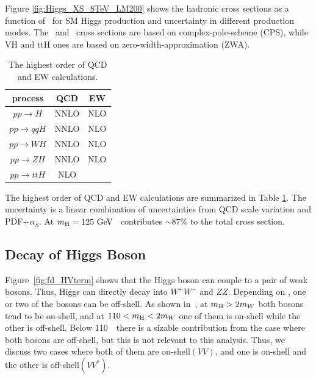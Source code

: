 Figure \ref{fig:Higgs_XS_8TeV_LM200} shows the hadronic cross sections 
as a function of \mHi\ for SM Higgs production and uncertainty 
in different production modes. The \ggH\ and \qqH\ cross sections 
are based on complex-pole-scheme (CPS), while VH and ttH ones 
are based on zero-width-approximation (ZWA). 
\begin{table}[htb]
\centering
\vspace{0.5cm} 
\caption{The highest order of QCD and EW calculations.}
\label{tab:Higgs_XS_8TeV_order}
\vspace{0.5cm} 
\begin{tabular}{c c c  }
\hline
process     & QCD   & EW \\
\hline \hline 
$ pp \rightarrow H$         & NNLO  & NLO \\
$ pp \rightarrow qqH$       & NNLO  & NLO \\
$ pp \rightarrow WH$        & NNLO  & NLO \\
$ pp \rightarrow ZH$        & NNLO  & NLO \\
$ pp \rightarrow ttH$       & NLO   &     \\
\hline 
\end{tabular}
\end{table}
The highest order of QCD and EW calculations are summarized in Table 
\ref{tab:Higgs_XS_8TeV_order}. The uncertainty is a linear combination 
of uncertainties from QCD scale variation and PDF+$\alpha_S$.
At $m_{\mathrm{H}}=125~\mathrm{Ge\kern -0.1em V}$ \ggH\ contributes $\sim 87 \%$ to the total cross section.



\newpage
\subsection{Decay of Higgs Boson}
\label{sec:decayHiggs}

Figure~\ref{fig:fd_HVterm} shows that the Higgs boson can 
couple to a pair of weak bosons. Thus, Higgs can directly decay into $W^+W^-$ and $ZZ$.
Depending on \mHi, one or two of the bosons can be off-shell. 
As shown in~\cite{Djouadi20081}, at $m_{\mathrm{H}}>2m_W$ both bosons 
tend to be on-shell, and at $110<m_{\mathrm{H}}<2m_W$ one of them is on-shell 
while the other is off-shell. Below 110~\GeV\ there is a sizable contribution 
from the case where both bosons are off-shell, but this is not relevant 
to this analysis. Thus, we discuss two cases where both of them are on-shell$(VV)$, 
and one is on-shell and the other is off-shell$(VV^*)$. 

